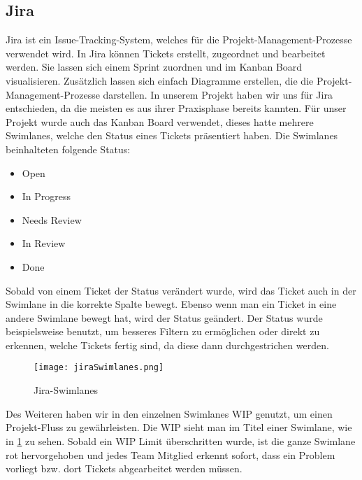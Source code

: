 \subsection{Jira}
    Jira ist ein Issue-Tracking-System, welches für die Projekt-Management-Prozesse verwendet wird.
    In Jira können Tickets erstellt, zugeordnet und bearbeitet werden. Sie lassen sich einem Sprint zuordnen und im Kanban Board visualisieren.
    Zusätzlich lassen sich einfach Diagramme erstellen, die die Projekt-Management-Prozesse darstellen.
    In unserem Projekt haben wir uns für Jira entschieden, da die meisten es aus ihrer Praxisphase bereits kannten.
    Für unser Projekt wurde auch das Kanban Board verwendet, dieses hatte mehrere Swimlanes, welche den Status eines Tickets präsentiert haben.
    Die Swimlanes beinhalteten folgende Status:
    \begin{itemize}
        \item Open
        \item In Progress
        \item Needs Review
        \item In Review
        \item Done
    \end{itemize}
    Sobald von einem Ticket der Status verändert wurde, wird das Ticket auch in der Swimlane in die korrekte Spalte bewegt. Ebenso wenn man ein Ticket in eine andere Swimlane bewegt hat, wird der Status geändert.
    Der Status wurde beispielsweise benutzt, um besseres Filtern zu ermöglichen oder direkt zu erkennen, welche Tickets fertig sind, da diese dann durchgestrichen werden.
    \begin{figure}[!hbt]
        \texttt{[image: jiraSwimlanes.png]}
        \caption{Jira-Swimlanes}
        \label{fig:Jira-Swimlanes}
    \end{figure}  
    Des Weiteren haben wir in den einzelnen Swimlanes \ac{WIP} genutzt, um einen Projekt-Fluss zu gewährleisten. Die \ac{WIP} sieht man im Titel einer Swimlane, wie in \ref{fig:Jira-Swimlanes} zu sehen.
    Sobald ein \ac{WIP} Limit überschritten wurde, ist die ganze Swimlane rot hervorgehoben und jedes Team Mitglied erkennt sofort, dass ein Problem vorliegt bzw. dort Tickets abgearbeitet werden müssen.

